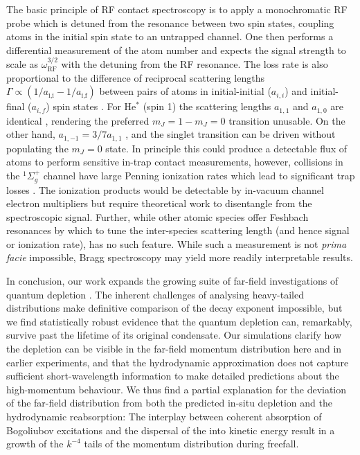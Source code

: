 	The basic principle of RF contact spectroscopy is to apply a monochromatic RF probe which is detuned from the resonance between two spin states, coupling atoms in the initial spin state to an untrapped channel. 
	One then performs a differential measurement of the atom number and expects the signal strength to scale as $\omega_\textrm{RF}^{3/2}$ with the detuning from the RF resonance.
	The loss rate is also proportional to the difference of reciprocal scattering lengths $\Gamma\propto(1/a_\textrm{i,i}-1/a_\textrm{i,f})$ between pairs of atoms in initial-initial ($a_{i,i}$) and initial-final ($a_{i,f}$) spin states \cite{Braaten10,Wild12}. 
	For He$^*$ (spin 1) the scattering lengths $a_{1,1}$ and $a_{1,0}$ are identical \cite{Leo01}, rendering the preferred $m_J=1-m_J=0$ transition unusable. 
	On the other hand, $a_{1,-1} = 3/7 a_{1,1}$ \cite{Vassen16}, and the singlet transition can be driven without populating the $m_J=0$ state. 
	In principle this could produce a detectable flux of atoms to perform sensitive in-trap contact measurements, however, collisions in the $^1\Sigma_{g}^{+}$ channel have large Penning ionization rates which lead to significant trap losses \cite{Leo01}. 
	The ionization products would be detectable by in-vacuum channel electron multipliers but require theoretical work to disentangle from the spectroscopic signal. 
	Further, while other atomic species offer Feshbach resonances by which to tune the inter-species scattering length (and hence signal or ionization rate), \mhe has no such feature. 
	While such a measurement is not \emph{prima facie} impossible, Bragg spectroscopy may yield more readily interpretable results.

	In conclusion, our work expands the growing suite of far-field investigations of quantum depletion \cite{Cayla20,Chang16}.
	The inherent challenges of analysing heavy-tailed distributions make definitive comparison of the decay exponent impossible, but we find statistically robust evidence that the  quantum depletion can, remarkably, survive past the lifetime of its original condensate. 
	Our simulations clarify how the depletion can be visible in the far-field momentum distribution here and in earlier experiments, and that the hydrodynamic approximation does not capture sufficient short-wavelength information to make detailed predictions about the high-momentum behaviour. 
	We thus find a partial explanation for the deviation of the far-field distribution from both the predicted in-situ depletion and the hydrodynamic reabsorption: The interplay between coherent absorption of Bogoliubov excitations and the dispersal of the  %
	into kinetic energy result in a growth of the $k^{-4}$ tails of the momentum distribution during freefall. 

